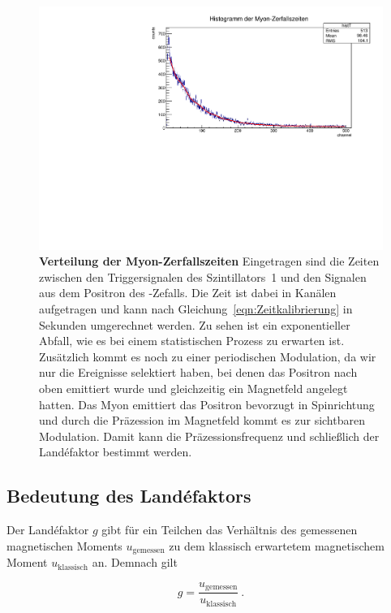 \documentclass[a4paper,ngerman]{scrartcl}
\begin{document}
\begin{figure}[tbh!]
  \centering
  \includegraphics[width=1.1\textwidth]{abbildungen/histogramm.pdf}
  \caption{\textbf{Verteilung der Myon-Zerfallszeiten}
  Eingetragen sind die Zeiten zwischen den Triggersignalen des Szintillators~1 und den
  Signalen aus dem Positron des \APmuon-Zefalls. Die Zeit ist dabei in Kanälen
  aufgetragen und kann nach Gleichung~\ref{eqn:Zeitkalibrierung} in
  Sekunden umgerechnet werden. Zu sehen ist ein exponentieller
  Abfall, wie es bei einem statistischen Prozess zu
  erwarten ist. Zusätzlich kommt es noch zu einer periodischen
  Modulation, da wir nur die Ereignisse selektiert haben, bei denen
  das Positron nach oben emittiert wurde und gleichzeitig ein Magnetfeld angelegt
  hatten. Das Myon emittiert das Positron bevorzugt in Spinrichtung
  und durch die Präzession im Magnetfeld kommt es zur sichtbaren
  Modulation. Damit kann die Präzessionsfrequenz und schließlich der
  Landéfaktor bestimmt werden.}

  \label{fig:zerfallszeiten}
\end{figure}

\clearpage
\subsection{Bedeutung des Landéfaktors}

Der Landéfaktor $g$ gibt für ein Teilchen das Verhältnis des gemessenen magnetischen Moments $ u_{\mathrm{gemessen}}$ zu dem klassisch erwartetem magnetischem Moment $u_{\mathrm{klassisch}}$ an. Demnach gilt

\begin{equation}
g = \frac{ u_{\mathrm{gemessen}} }{u_{\mathrm{klassisch}} } ~.
\end{equation}
\end{document}
